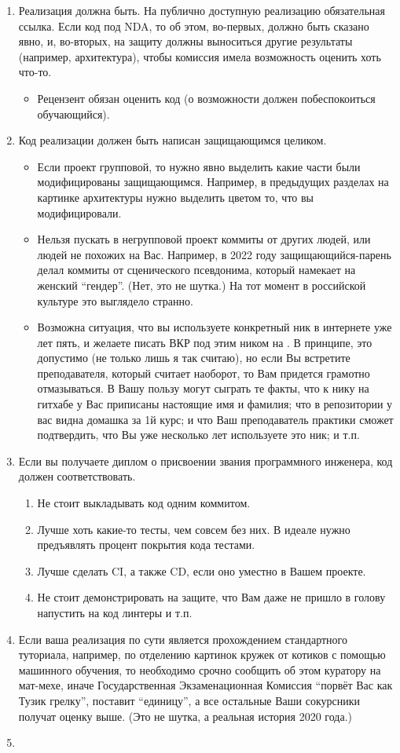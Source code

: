\begin{enumerate}
\item Реализация должна быть. На публично доступную реализацию обязательная ссылка. Если код под \textsc{NDA}, то об этом, во-первых, должно быть сказано явно, и, во-вторых, на защиту должны выноситься другие результаты (например, архитектура), чтобы комиссия имела возможность оценить хоть что-то.
\begin{itemize}
\item  Рецензент обязан оценить код (о возможности должен побеспокоиться обучающийся).
\end{itemize} 
\item Код реализации должен быть написан защищающимся целиком.
\begin{itemize}
\item  Если проект групповой, то нужно явно выделить какие части были модифицированы защищающимся. Например, в предыдущих разделах на картинке архитектуры нужно выделить цветом то, что вы модифицировали.
\item Нельзя пускать в негрупповой проект коммиты от других людей, или людей не похожих на Вас. Например, в 2022 году защищающийся-парень делал коммиты от сценического псевдонима, который намекает на женский ``гендер''. (Нет, это не шутка.) На тот момент в российской культуре это выглядело странно.
\item Возможна ситуация, что вы используете конкретный ник в интернете уже лет пять, и желаете писать ВКР под этим ником на \GitHub{}. В принципе, это допустимо (не только лишь я так считаю), но если Вы встретите преподавателя, который считает наоборот, то Вам придется грамотно отмазываться. В Вашу пользу могут сыграть те факты, что к нику на гитхабе у Вас приписаны настоящие имя и фамилия; что в репозитории у вас видна домашка за 1й курс; и что Ваш преподаватель практики сможет подтвердить, что Вы уже несколько лет используете это ник; и т.п.
\end{itemize} 
\item Если вы получаете диплом о присвоении звания программного инженера, код должен соответствовать. 
\begin{enumerate}
\item Не стоит выкладывать код одним коммитом.
\item Лучше хоть какие-то тесты, чем совсем без них. В идеале нужно предъявлять процент покрытия кода тестами.
\item Лучше  сделать \textsc{CI}, а также \textsc{CD}, если оно уместно в Вашем проекте.
\item Не стоит демонстрировать на защите, что Вам даже не пришло в голову напустить на код линтеры и т.п.
\end{enumerate}
\item Если ваша реализация по сути является прохождением стандартного туториала, например, по отделению картинок кружек от котиков с помощью машинного обучения, то необходимо срочно сообщить об этом куратору на мат-мехе, иначе Государственная Экзаменационная Комиссия ``порвёт Вас как Тузик грелку'', поставит ``единицу'', а все остальные Ваши сокурсники получат оценку выше. (Это не шутка, а реальная история 2020 года.)
\item 
\end{enumerate}

